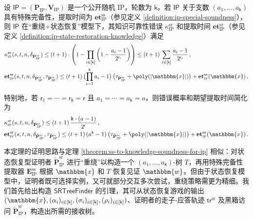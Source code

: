 \documentclass[american,singlepageview]{snargs-book-zh}
\newcommand{\Malicious}[1]{\tilde{#1}}
\newcommand{\Instance}{\mathbbm{x}}
\newcommand{\Witness}{\mathbbm{w}}
\newcommand{\InstanceSize}{n}
\newcommand{\ProtoProver}{P}
\newcommand{\ProtoVerifier}{V}
\newcommand{\ProtoExtractor}{E}
\newcommand{\ProtoKnowledgeError}{\kappa}
\newcommand{\ProtoKnowledgeTime}{\mathbf{et}}
\newcommand{\ProtoRoundComplexity}{\mathsf{k}}
\newcommand{\ProtoRandomnessComplexity}{\mathsf{r}}
\newcommand{\RoundIndex}{i}
\newcommand{\SRSuperscript}{\mathrm{sr}}
\newcommand{\ProtoSRKnowledgeError}{\ProtoKnowledgeError^{\SRSuperscript}}
\newcommand{\IPSymbol}{\mathsf{IP}}
\newcommand{\IPSystem}{(\IPProver,\IPVerifier)}
\newcommand{\IPSubscript}{\scriptscriptstyle\mathrm{IP}}
\newcommand{\IPFormat}[1]{\mathbf{#1}}
\newcommand{\IPProver}{\IPFormat{\ProtoProver}_{\IPSubscript}}
\newcommand{\IPVerifier}{\IPFormat{\ProtoVerifier}_{\IPSubscript}}
\newcommand{\IPExtractor}{\IPFormat{\ProtoExtractor}_{\IPSubscript}}
\newcommand{\IPMaliciousProver}{\Malicious{\IPFormat{\ProtoProver}}_{\IPSubscript}}
\newcommand{\IPRoundComplexity}{\ProtoRoundComplexity}
\newcommand{\IPRandomnessComplexity}{\ProtoRandomnessComplexity}
\newcommand{\IPRandomnessCardinality}[1]{2^{\ProtoRandomnessComplexity_{#1}}}
\newcommand{\IPProverMessage}{\alpha}
\newcommand{\IPVerifierRandomMessage}{\rho}
\newcommand{\IPTuple}[1]{(#1_{\RoundIndex})_{\RoundIndex \in [\IPRoundComplexity]}}
\newcommand{\ProverFailureProbability}[1]{\delta_{#1}}
\newcommand{\ProverRunningTime}[1]{\tau_{#1}}
\newcommand{\ROTrace}{\mathsf{tr}}
\newcommand{\SRBudget}{t}
\newcommand{\SRSaltSize}{s}
\newcommand{\SRSaltString}{\sigma}
\newcommand{\SRSaltStrings}[1]{(\SRSaltString_{\RoundIndex})_{\RoundIndex \in [#1]}}
\newcommand{\SRTrace}{\ROTrace^{\SRSuperscript}}
\newcommand{\IPSRKnowledgeError}{\ProtoSRKnowledgeError_{\IPSubscript}}
\newcommand{\IPSRKnowledgeTime}{\ProtoKnowledgeTime_{\IPSubscript}^{\SRSuperscript}}
\newcommand{\IPMaliciousSRProver}{\IPMaliciousProver^{\SRSuperscript}}
\newcommand{\IPSROutput}{(\Instance,\IPTuple{\IPProverMessage},\SRSaltStrings{\IPRoundComplexity},\IPTuple{\IPVerifierRandomMessage})}
\newcommand{\SSSuperscript}{\mathrm{ss}}
\newcommand{\SSArity}{a}
\newcommand{\SSTree}{T}
\newcommand{\IPSSExtractor}{\IPExtractor^{\SSSuperscript}}
\newcommand{\IPSSKnowledgeTime}{\ProtoKnowledgeTime_{\IPSubscript}^{\SSSuperscript}}
\newcommand{\SSSRTreeFinder}{\mathsf{SRTreeFinder}}
\newcommand{\IPKowledgeErrorMainFromSS}{\prod_{\RoundIndex \in [\IPRoundComplexity]} \left( 1 - \frac{\SSArity_{\RoundIndex}-1}{\IPRandomnessCardinality{\RoundIndex}} \right)}
\newcommand{\IPKowledgeErrorSimpleFromSS}{\sum_{\RoundIndex \in [\IPRoundComplexity]} \frac{\SSArity_{\RoundIndex}-1}{\IPRandomnessCardinality{\RoundIndex}}}
\newcommand{\IPSRKowledgeErrorMainFromSS}{\IPKowledgeErrorMainFromSS}
\newcommand{\IPSRKowledgeErrorFromSS}{(\SRBudget+1) \cdot \left(1-\IPSRKowledgeErrorMainFromSS \right)}
\begin{document}
\begin{theorem}
\label{theorem:ss-to-sr-knowledge-soundness-for-ip}
设 $\IPSymbol=\IPSystem$ 是一个公开随机 IP，轮数为 $\IPRoundComplexity$。若 $\IPSymbol$ 关于支数 $(\SSArity_{1},\dots,\SSArity_{\IPRoundComplexity})$ 具有特殊完备性，提取时间为 $\IPSSKnowledgeTime$（参见定义 \ref{definition:ip-special-soundness}），则 $\IPSymbol$ 在“重绕+状态恢复”模型下，其知识可靠性错误 $\IPSRKnowledgeError$ 和提取时间 $\IPSRKnowledgeTime$（参见定义 \ref{definition:ip-state-restoration-knowledge}）满足
\begin{align*}
&\IPSRKnowledgeError(\SRSaltSize,\SRBudget,\InstanceSize,\ProverFailureProbability{\IPMaliciousSRProver})
\le
\IPSRKowledgeErrorFromSS
\le
(\SRBudget+1)\,\IPKowledgeErrorSimpleFromSS
\,,\\
&\IPSRKnowledgeTime(\SRSaltSize,\SRBudget,\InstanceSize,\ProverFailureProbability{\IPMaliciousSRProver},\ProverRunningTime{\IPMaliciousSRProver})
\le
(\SRBudget+1)\,\bigl(\prod_{\RoundIndex=1}^{\IPRoundComplexity}\SSArity_{\RoundIndex}-1\bigr)\,
\bigl(\ProverRunningTime{\IPMaliciousSRProver}+\poly(\lvert\Instance\rvert)\bigr)
+\IPSSKnowledgeTime(\Instance)\,.
\end{align*}
\end{theorem}

特别地，若 $\IPRandomnessComplexity_{1}=\cdots=\IPRandomnessComplexity_{\IPRoundComplexity}=\IPRandomnessComplexity$ 且 $\SSArity_{1}=\cdots=\SSArity_{\IPRoundComplexity}=\SSArity$，则错误概率和期望提取时间简化为
\begin{align*}
&\IPSRKnowledgeError(\SRSaltSize,\SRBudget,\InstanceSize,\ProverFailureProbability{\IPMaliciousSRProver})
\le
(\SRBudget+1)\,\frac{\IPRoundComplexity\cdot(\SSArity-1)}{2^{\IPRandomnessComplexity}}
\,,\\
&\IPSRKnowledgeTime(\SRSaltSize,\SRBudget,\InstanceSize,\ProverFailureProbability{\IPMaliciousSRProver},\ProverRunningTime{\IPMaliciousSRProver})
\le
(\SRBudget+1)\,(\SSArity^{\IPRoundComplexity}-1)\,
\bigl(\ProverRunningTime{\IPMaliciousSRProver}+\poly(\lvert\Instance\rvert)\bigr)
+\IPSSKnowledgeTime(\Instance)\,.
\end{align*}

本定理的证明思路与定理 \ref{theorem:ss-to-knowledge-soundness-for-ip} 相似：对状态恢复型证明者 $\IPMaliciousSRProver$ 进行“重绕”以构造一个 $(\SSArity_{1},\dots,\SSArity_{\IPRoundComplexity})$-树 $\SSTree$，再用特殊完备性提取器 $\IPSSExtractor$ 根据 $\Instance$ 和 $\SSTree$ 恢复见证 $\Witness$。但由于状态恢复模型中，证明者既可选择实例，又可就部分交互多次尝试，重绕策略需更为精细。我们首先给出构造 $\SSSRTreeFinder$ 的引理，其可从状态恢复游戏的输出 $\IPSROutput$、证明者的走子‐应答轨迹 $\SRTrace$ 及黑箱访问 $\IPMaliciousSRProver$，构造出所需的接收树。
\end{document}
